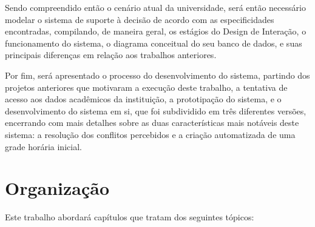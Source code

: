 
Sendo compreendido então o cenário atual da universidade, será então necessário modelar o sistema de suporte à decisão de acordo com as especificidades encontradas, compilando, de maneira geral, os estágios do Design de Interação, o funcionamento do sistema, o diagrama conceitual do seu banco de dados, e suas principais diferenças em relação aos trabalhos anteriores.

Por fim, será apresentado o processo do desenvolvimento do sistema, partindo dos projetos anteriores que motivaram a execução deste trabalho, a tentativa de acesso aos dados acadêmicos da instituição, a prototipação do sistema, e o desenvolvimento do sistema em si, que foi subdividido em três diferentes versões, encerrando com mais detalhes sobre as duas características mais notáveis deste sistema: a resolução dos conflitos percebidos e a criação automatizada de uma grade horária inicial.


\section{Organização} \label{sec:Organização}            %

Este trabalho abordará capítulos que tratam dos seguintes tópicos:

